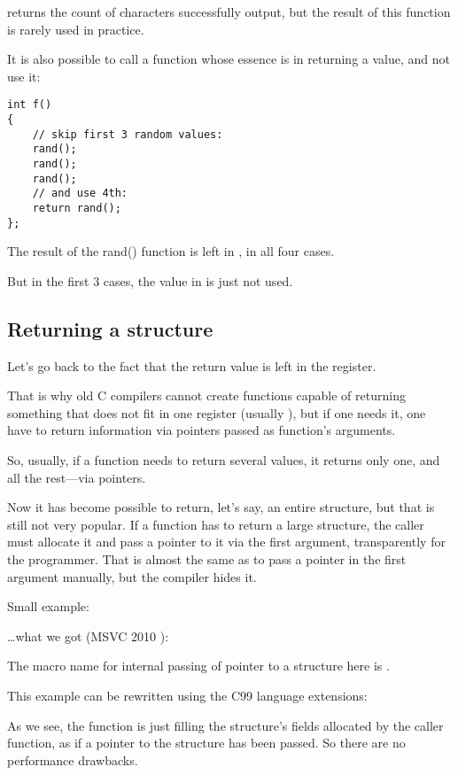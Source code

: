 \printf returns the count of characters successfully output, but the result of this function 
is rarely used in practice.

It is also possible to call a function whose essence is in returning a value, and not use it:

\begin{lstlisting}[style=customc]
int f()
{
    // skip first 3 random values:
    rand();
    rand();
    rand();
    // and use 4th:
    return rand();
};
\end{lstlisting}

The result of the rand() function is left in \EAX, in all four cases.

But in the first 3 cases, the value in \EAX is just not used.

\subsection{Returning a structure}


Let's go back to the fact that the return value is left in the \EAX register.

That is why old C compilers cannot create functions capable of returning something that does not fit in one 
register (usually \Tint), but if one needs it, one have to return information via pointers passed 
as function's arguments.

So, usually, if a function needs to return several values, it returns only one, and 
all the rest---via pointers.

Now it has become possible to return, let's say, an entire structure, but that is still not very popular. 
If a function has to return a large structure, the \gls{caller} must allocate it and pass a pointer to it via the first argument, transparently for the programmer. 
That is almost the same as to pass a pointer in the first argument manually, but the compiler hides it.

Small example:



\dots what we got (MSVC 2010 \Ox):



The macro name for internal passing of pointer to a structure here is .

This example can be rewritten using
the C99 language extensions:





As we see, the function is just filling the structure's fields allocated by
the caller function,
as if a pointer to the structure has been passed.
So there are no performance drawbacks.
